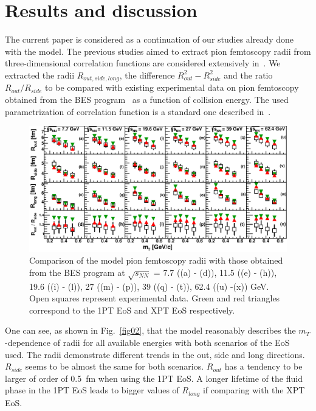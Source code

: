 \documentclass[a4paper]{panl}
\begin{document}
  \section*{Results and discussion}
  The current paper is considered as a continuation of our studies already done with the model. The previous studies aimed to extract pion femtoscopy radii from three-dimensional
  correlation functions are considered extensively in~\cite{Batyuk:2017smw}.
  We extracted the radii $R_{out, side, long}$, the difference $R^{2}_{out} - R^{2}_{side}$ and the ratio $R_{out} / R_{side}$ to be compared with existing experimental data on pion femtoscopy
  obtained from the BES program~\cite{Adamczyk:2014mxp} as a function of collision energy. The used parametrization of correlation function is a standard one described in~\cite{Pratt:1986cc, Bertsch:1988db}.
  \begin{figure}[t]
    \begin{center}
      \includegraphics[width=127mm]{fig2.eps}
      \vspace{-3mm}
      \caption{Comparison of the model pion femtoscopy radii with those obtained from the BES program at
        $\sqrt{s_{NN}}$ = 7.7 ((a) - (d)), 11.5 ((e) - (h)), 19.6 ((i) - (l)), 27 ((m) - (p)), 39 ((q) - (t)), 62.4 ((u) -(x)) GeV.
        Open squares represent experimental data. Green and red triangles correspond to the 1PT EoS and XPT EoS respectively.}
    \end{center}
    \vspace{-5mm}
  \end{figure}

  One can see, as shown in Fig.~\ref{fig02}, that the model reasonably describes the $m_{T}$-dependence of radii for all available energies with both scenarios of the EoS used.
  The radii demonstrate different trends in the out, side and long directions. $R_{side}$ seems to be almost the same for both scenarios.
  $R_{out}$ has a tendency to be larger of order of 0.5~fm when using the 1PT EoS.
  A longer lifetime of the fluid phase in the 1PT EoS leads to bigger values of $R_{long}$ if comparing with the XPT EoS.
\end{document}
